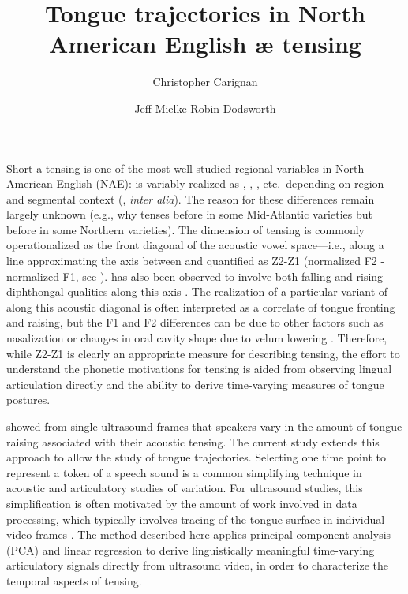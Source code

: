 \documentclass[output=paper]{LSP/langsci}
\author{Christopher Carignan\affiliation{??} \and Jeff Mielke\affiliation{??} \lastand Robin Dodsworth\affiliation{??}}
\title{Tongue trajectories in {N}orth {A}merican {E}nglish {æ} tensing}
\begin{document}
 



Short-a tensing is one of the most well-studied regional variables in North American English (NAE): \ips{\ae} is variably realized as \ip{\ae}, , , etc.~depending on region and segmental context 
(\citealp{ash_distribution_2002,becker_short-system_2009,boberg_regional_2008,boberg_short-cincinnati:_2000,labov_atlas_2006-1,plichta_interdisciplinary_2005}, \textit{inter alia}). The reason for these differences remain largely unknown (e.g., why \ips{\ae} tenses before  in some Mid-Atlantic varieties but before  in some Northern varieties). The dimension of \ips{\ae} tensing is commonly operationalized as the front diagonal of the acoustic vowel space---i.e., along a line approximating the axis between  and  quantified as Z2-Z1 (normalized F2 - normalized F1, see \citealp{labov_one_2013}). \ips{\ae} has also been observed to involve both falling and rising diphthongal qualities along this axis \citep{assmann_time-varying_2000,fox_cross-dialectal_2009,labov_atlas_2006-1}.  The realization of a particular variant of \ips{\ae} along this acoustic diagonal is often interpreted as a correlate of tongue fronting and raising, but the F1 and F2 differences can be due to other factors such as nasalization \citep{decker_are_2012} or changes in oral cavity shape due to velum lowering \citep{baker_more_2008}.  Therefore, while Z2-Z1 is clearly an appropriate measure for describing \ips{\ae} tensing, the effort to understand the phonetic motivations for \ips{\ae} tensing is aided from observing lingual articulation directly and the ability to derive time-varying measures of tongue postures. 

\citet{decker_are_2012} showed from single ultrasound frames that speakers vary in the amount of tongue raising associated with their acoustic tensing.  The current study extends this approach to allow the study of tongue trajectories. Selecting one time point to represent a token of a speech sound is a common simplifying technique in acoustic and articulatory studies of variation.  For ultrasound studies, this simplification is often motivated by the amount of work involved in data processing, which typically involves tracing of the tongue surface in individual video frames \citep{li_automatic_2005}.
The method described here applies principal component analysis (PCA) and linear regression to derive linguistically meaningful time-varying articulatory signals directly from ultrasound video, in order to characterize the temporal aspects of \ips{\ae} tensing.
\end{document}
